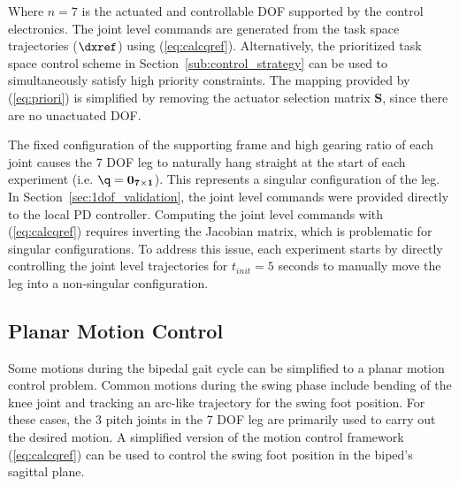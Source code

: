 Where $n = 7$ is the actuated and controllable DOF supported by the control electronics. The joint level commands are generated from the task space trajectories ($\dxref$) using (\ref{eq:calcqref}). Alternatively, the prioritized task space control scheme in Section~\ref{sub:control_strategy} can be used to simultaneously satisfy high priority constraints. The mapping provided by (\ref{eq:priori}) is simplified by removing the actuator selection matrix $\mathbf{S}$, since there are no unactuated DOF. 

The fixed configuration of the supporting frame and high gearing ratio of each joint causes the 7 DOF leg to naturally hang straight at the start of each experiment (i.e. $\q = \mathbf{0_{7 \times 1}}$). This represents a singular configuration of the leg. In Section~\ref{sec:1dof_validation}, the joint level commands were provided directly to the local PD controller. Computing the joint level commands with (\ref{eq:calcqref}) requires inverting the Jacobian matrix, which is problematic for singular configurations. To address this issue, each experiment starts by directly controlling the joint level trajectories for $t_{init} = 5$ seconds to manually move the leg into a non-singular configuration. 

\subsection{Planar Motion Control} %
\label{sub:planar_motion_control}
Some motions during the bipedal gait cycle can be simplified to a planar motion control problem. Common motions during the swing phase include bending of the knee joint and tracking an arc-like trajectory for the swing foot position. For these cases, the 3 pitch joints in the 7 DOF leg are primarily used to carry out the desired motion. A simplified version of the motion control framework (\ref{eq:calcqref}) can be used to control the swing foot position in the biped's sagittal plane.

